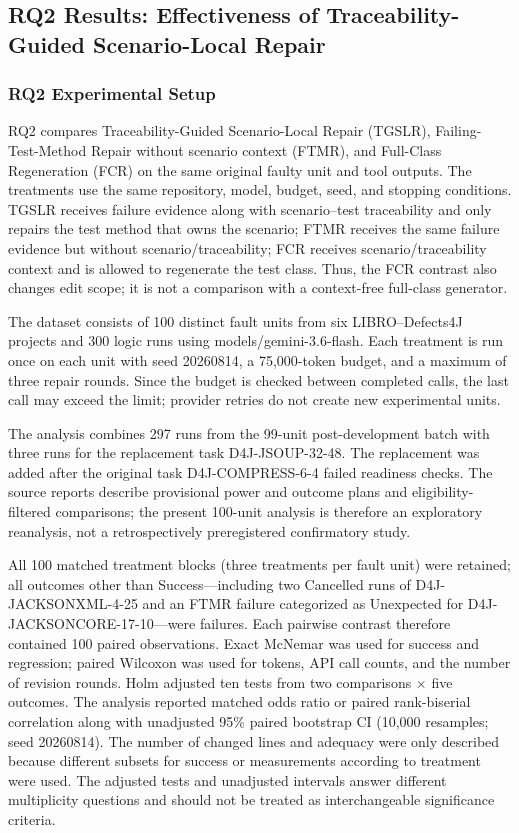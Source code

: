 \documentclass[pdflatex,sn-basic,Numbered,iicol]{sn-jnl}
\begin{document}
\subsection{RQ2 Results: Effectiveness of Traceability-Guided Scenario-Local Repair}\label{subsec:rq2}

\subsubsection{RQ2 Experimental Setup}\label{subsubsec:rq2-setup}

RQ2 compares Traceability-Guided Scenario-Local Repair (TGSLR), Failing-Test-Method Repair without scenario context (FTMR), and Full-Class Regeneration (FCR) on the same original faulty unit and tool outputs. The treatments use the same repository, model, budget, seed, and stopping conditions. TGSLR receives failure evidence along with scenario--test traceability and only repairs the test method that owns the scenario; FTMR receives the same failure evidence but without scenario/traceability; FCR receives scenario/traceability context and is allowed to regenerate the test class. Thus, the FCR contrast also changes edit scope; it is not a comparison with a context-free full-class generator.

The dataset consists of 100 distinct fault units from six LIBRO--Defects4J projects and 300 logic runs using models/gemini-3.6-flash. Each treatment is run once on each unit with seed 20260814, a 75,000-token budget, and a maximum of three repair rounds. Since the budget is checked between completed calls, the last call may exceed the limit; provider retries do not create new experimental units.

The analysis combines 297 runs from the 99-unit post-development batch with three runs for the replacement task D4J-JSOUP-32-48. The replacement was added after the original task D4J-COMPRESS-6-4 failed readiness checks. The source reports describe provisional power and outcome plans and eligibility-filtered comparisons; the present 100-unit analysis is therefore an exploratory reanalysis, not a retrospectively preregistered confirmatory study.

All 100 matched treatment blocks (three treatments per fault unit) were retained; all outcomes other than Success---including two Cancelled runs of D4J-JACKSONXML-4-25 and an FTMR failure categorized as Unexpected for D4J-JACKSONCORE-17-10---were failures. Each pairwise contrast therefore contained 100 paired observations. Exact McNemar was used for success and regression; paired Wilcoxon was used for tokens, API call counts, and the number of revision rounds. Holm adjusted ten tests from two comparisons \ensuremath{\times} five outcomes. The analysis reported matched odds ratio or paired rank-biserial correlation along with unadjusted 95\% paired bootstrap CI (10,000 resamples; seed 20260814). The number of changed lines and adequacy were only described because different subsets for success or measurements according to treatment were used. The adjusted tests and unadjusted intervals answer different multiplicity questions and should not be treated as interchangeable significance criteria.
\end{document}
